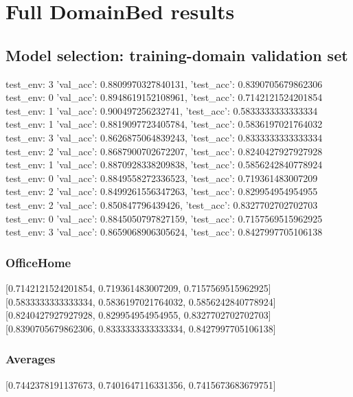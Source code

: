 \documentclass{article}
\begin{document}
\section{Full DomainBed results}

\subsection{Model selection: training-domain validation set}
test_env: 3
{'val_acc': 0.8809970327840131, 'test_acc': 0.8390705679862306}
test_env: 0
{'val_acc': 0.8948619152108961, 'test_acc': 0.7142121524201854}
test_env: 1
{'val_acc': 0.900497256232741, 'test_acc': 0.5833333333333334}
test_env: 1
{'val_acc': 0.8819097723405784, 'test_acc': 0.5836197021764032}
test_env: 3
{'val_acc': 0.8626875064839243, 'test_acc': 0.8333333333333334}
test_env: 2
{'val_acc': 0.8687900702672207, 'test_acc': 0.8240427927927928}
test_env: 1
{'val_acc': 0.8870928338209838, 'test_acc': 0.5856242840778924}
test_env: 0
{'val_acc': 0.8849558272336523, 'test_acc': 0.719361483007209}
test_env: 2
{'val_acc': 0.8499261556347263, 'test_acc': 0.829954954954955}
test_env: 2
{'val_acc': 0.850847796439426, 'test_acc': 0.8327702702702703}
test_env: 0
{'val_acc': 0.8845050797827159, 'test_acc': 0.7157569515962925}
test_env: 3
{'val_acc': 0.8659068906305624, 'test_acc': 0.8427997705106138}

\subsubsection{OfficeHome}
[0.7142121524201854, 0.719361483007209, 0.7157569515962925]
[0.5833333333333334, 0.5836197021764032, 0.5856242840778924]
[0.8240427927927928, 0.829954954954955, 0.8327702702702703]
[0.8390705679862306, 0.8333333333333334, 0.8427997705106138]

\begin{center}
\end{center}

\subsubsection{Averages}
[0.7442378191137673, 0.7401647116331356, 0.7415673683679751]

\begin{center}
\end{center}
\end{document}
